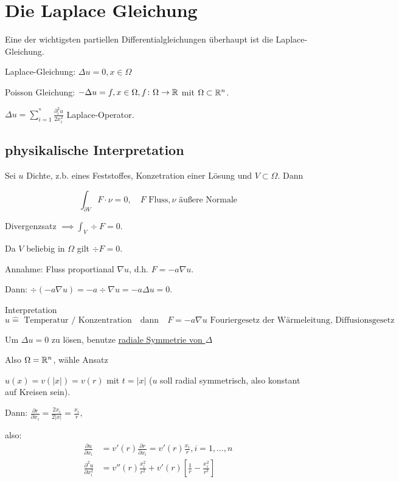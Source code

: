 \section{Die Laplace Gleichung}

Eine der wichtigsten partiellen Differentialgleichungen überhaupt ist die Laplace-Gleichung.

Laplace-Gleichung: $\Delta u = 0, x \in \Omega$

Poisson Gleichung: $-\Delta u = f, x \in \Omega, f \colon \Omega \to \mathbb{R}$
mit $\Omega \subset \mathbb{R}^n$.

$ \Delta u = \sum_{i = 1}^^n \frac{\partial_i^2 u}{2 x_i^2}$ Laplace-Operator.

\subsection{physikalische Interpretation}

Sei $u$ Dichte, z.b. eines Feststoffes, Konzetration einer Lösung und $V \subset \Omega$. Dann

$$
\int_{\partial V} F \cdot \nu = 0, \quad F \text{ Fluss}, \nu \text{ äußere Normale}
$$

Divergenzsatz $\implies \int_V \div F = 0$.

Da $V$ beliebig in $\Omega$ gilt $\div F = 0$.

Annahme: Fluss proportianal $\nabla u$, d.h. $F = -a \nabla u$.

Dann: $\div(-a \nabla u) = - a \div \nabla u = - a \Delta u = 0$.

Interpretation
$$
u \hat = \text{ Temperatur / Konzentration} \quad \text{dann} \quad F = - a \nabla u \text{ Fouriergesetz der Wärmeleitung, Diffusionsgesetz}
$$

Um $\Delta u = 0$ zu lösen, benutze \underline{radiale Symmetrie von $\Delta$}

Also $\Omega = \mathbb{R}^n$, wähle Ansatz

$u(x) = v(|x|) = v(r)$ mit $t = |x|$ ($u$ soll radial symmetrisch, also konstant auf Kreisen sein).

Dann: $\frac{\partial r}{\partial x_i} = \frac{2 x_i}{2 |x|} = \frac{x_i}{r},$

also: 
\begin{align*}
  \frac{\partial u}{\partial x_i} &= v'(r) \frac{\partial r}{\partial x_i} = v'(r) \frac{x_i}{r}, i = 1, \dots, n \\
  \frac{\partial^2 u}{\partial x_i^2} &= v''(r) \frac{x_i^2}{r^2} + v'(r)[\frac{1}{r} - \frac{x_i^2}{r^3}]
\end{align*}

